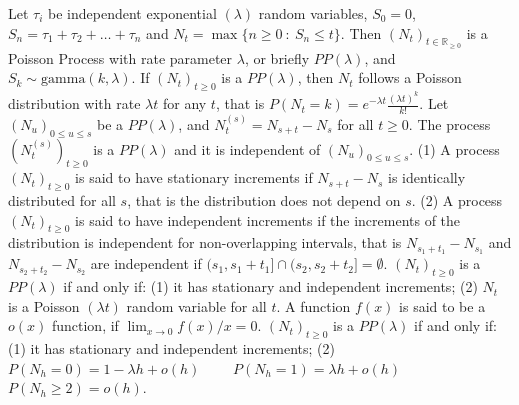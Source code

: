  Let $\tau_i$ be independent exponential $(\lambda)$ random variables, $S_0 = 0$, $S_n = \tau_1 + \tau_2 + \ldots + \tau_n$ and $N_t = \max\{n \ge 0\ :\ S_n \le t\}$. Then $(N_t)_{t \in \mathbb{R}_{\ge 0}}$ is a Poisson Process with rate parameter $\lambda$, or briefly $PP(\lambda)$, and $S_k \sim \mathrm{gamma}(k, \lambda)$.
 If $(N_t)_{t \ge 0}$ is a $PP(\lambda)$, then $N_t$ follows a Poisson distribution with rate $\lambda t$ for any $t$, that is $P(N_t = k) = e^{-\lambda t}\frac{(\lambda t)^k}{k!}$.
 Let $(N_u)_{0 \le u \le s}$ be a  $PP(\lambda)$, and $N^{(s)}_t = N_{s+t}-N_s$ for all $t \ge 0$. The process $(N^{(s)}_t)_{t \ge 0}$ is a $PP(\lambda)$ and it is independent of $(N_u)_{0 \le u \le s}$.
(1) A process $(N_t)_{t \ge 0}$  is said to have stationary increments if $N_{s+t} - N_s$ is identically distributed for all $s$, that is the distribution does not depend on $s$.
(2) A process $(N_t)_{t \ge 0}$ is said to have independent increments if the increments of the distribution is independent for non-overlapping intervals, that is $N_{s_1 + t_1} - N_{s_1}$ and $N_{s_2 + t_2} -N_{s_2}$ are independent if $(s_1,s_1 + t_1] \cap (s_2,s_2 + t_2] = \emptyset$.
 $(N_t)_{t \ge 0}$ is a $PP(\lambda)$ if and only if: 
(1) it has stationary and independent increments; 
(2) $N_t$ is a Poisson $(\lambda t)$ random variable for all $t$.
 A function $f(x)$ is said to be a $o(x)$ function, if $\lim_{x \to 0} f(x)/x = 0$.
 $(N_t)_{t \ge 0}$ is a $PP(\lambda)$ if and only if: 
(1) it has stationary and independent increments;
(2) $P(N_h = 0) = 1 -\lambda h +o(h) \qquad$ 
$P(N_h = 1) = \lambda h + o(h) \qquad$ 
$P(N_h \ge 2) = o(h)$.